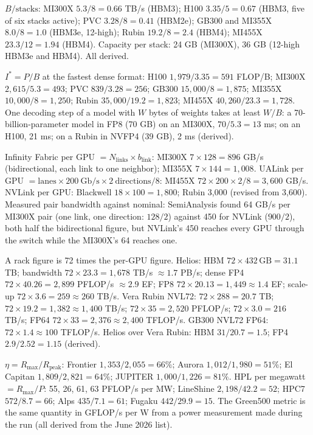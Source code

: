 \documentclass[11pt,letterpaper]{article}
\begin{document}
\begin{description}[leftmargin=0pt,labelindent=0pt,itemsep=6pt,font=\normalfont\bfseries\sffamily]
\item[HBM per stack.] $B/\text{stacks}$: MI300X $5.3/8 = 0.66$ TB/s (HBM3); H100 $3.35/5 = 0.67$ (HBM3, five of six stacks active); PVC $3.28/8 = 0.41$ (HBM2e); GB300 and MI355X $8.0/8 = 1.0$ (HBM3e, 12-high); Rubin $19.2/8 = 2.4$ (HBM4); MI455X $23.3/12 = 1.94$ (HBM4). Capacity per stack: 24 GB (MI300X), 36 GB (12-high HBM3e and HBM4). All derived.
\item[Ridge point and decode time.] $I^\ast = P/B$ at the fastest dense format: H100 $1{,}979/3.35 = 591$ FLOP/B; MI300X $2{,}615/5.3 = 493$; PVC $839/3.28 = 256$; GB300 $15{,}000/8 = 1{,}875$; MI355X $10{,}000/8 = 1{,}250$; Rubin $35{,}000/19.2 = 1{,}823$; MI455X $40{,}260/23.3 = 1{,}728$. One decoding step of a model with $W$ bytes of weights takes at least $W/B$: a 70-billion-parameter model in FP8 (70 GB) on an MI300X, $70/5.3 = 13$ ms; on an H100, 21 ms; on a Rubin in NVFP4 (39 GB), 2 ms (derived).
\item[Scale-up arithmetic.] Infinity Fabric per GPU $= N_{\text{links}}\times b_{\text{link}}$: MI300X $7\times 128 = 896$ GB/s (bidirectional, each link to one neighbor); MI355X $7\times 144 = 1{,}008$. UALink per GPU $= \text{lanes}\times 200\ \mathrm{Gb/s}\times 2\ \text{directions}/8$: MI455X $72\times 200\times 2/8 = 3{,}600$ GB/s. NVLink per GPU: Blackwell $18\times 100 = 1{,}800$; Rubin 3{,}000 (revised from 3{,}600). Measured pair bandwidth against nominal: SemiAnalysis found 64 GB/s per MI300X pair (one link, one direction: $128/2$) against 450 for NVLink ($900/2$), both half the bidirectional figure, but NVLink's 450 reaches every GPU through the switch while the MI300X's 64 reaches one.
\item[Rack totals.] A rack figure is 72 times the per-GPU figure. Helios: HBM $72\times 432\,\mathrm{GB} = 31.1$ TB; bandwidth $72\times 23.3 = 1{,}678$ TB/s $\approx 1.7$ PB/s; dense FP4 $72\times 40.26 = 2{,}899$ PFLOP/s $\approx 2.9$ EF; FP8 $72\times 20.13 = 1{,}449 \approx 1.4$ EF; scale-up $72\times 3.6 = 259 \approx 260$ TB/s. Vera Rubin NVL72: $72\times 288 = 20.7$ TB; $72\times 19.2 = 1{,}382 \approx 1{,}400$ TB/s; $72\times 35 = 2{,}520$ PFLOP/s; $72\times 3.0 = 216$ TB/s; FP64 $72\times 33 = 2{,}376 \approx 2{,}400$ TFLOP/s. GB300 NVL72 FP64: $72\times 1.4 \approx 100$ TFLOP/s. Helios over Vera Rubin: HBM $31/20.7 = 1.5$; FP4 $2.9/2.52 = 1.15$ (derived).
\item[HPL efficiency and efficiency per watt.] $\eta = R_{\max}/R_{\text{peak}}$: Frontier $1{,}353/2{,}055 = 66\%$; Aurora $1{,}012/1{,}980 = 51\%$; El Capitan $1{,}809/2{,}821 = 64\%$; JUPITER $1{,}000/1{,}226 = 81\%$. HPL per megawatt $= R_{\max}/P$: 55, 26, 61, 63 PFLOP/s per MW; LineShine $2{,}198/42.2 = 52$; HPC7 $572/8.7 = 66$; Alps $435/7.1 = 61$; Fugaku $442/29.9 = 15$. The Green500 metric is the same quantity in GFLOP/s per W from a power measurement made during the run (all derived from the June 2026 list).

\end{description}
\end{document}
